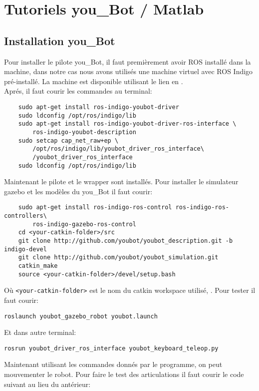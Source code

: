 \section{Tutoriels you\_Bot / Matlab}
\label{appen:commum}
\subsection{Installation you\_Bot}
Pour installer le pilote you\_Bot, il faut premièrement avoir ROS installé dans la machine, dans notre cas nous avons utilisés une machine virtuel avec ROS Indigo pré-installé. La machine est disponible utilisant le lien en \cite{downloadmachine}.\\
Aprés, il faut courir les commandes au terminal:


\begin{verbatim}
	sudo apt-get install ros-indigo-youbot-driver
	sudo ldconfig /opt/ros/indigo/lib
	sudo apt-get install ros-indigo-youbot-driver-ros-interface \
	    ros-indigo-youbot-description
	sudo setcap cap_net_raw+ep \
	    /opt/ros/indigo/lib/youbot_driver_ros_interface\
	    /youbot_driver_ros_interface
	sudo ldconfig /opt/ros/indigo/lib
\end{verbatim}
	Maintenant le pilote et le \flqq{}wrapper\frqq{} sont installés. Pour installer le simulateur gazebo et les modèles du you\_Bot il faut courir:

\begin{verbatim}	
	sudo apt-get install ros-indigo-ros-control ros-indigo-ros-controllers\
	    ros-indigo-gazebo-ros-control
	cd <your-catkin-folder>/src
	git clone http://github.com/youbot/youbot_description.git -b indigo-devel
	git clone http://github.com/youbot/youbot_simulation.git
	catkin_make
	source <your-catkin-folder>/devel/setup.bash
\end{verbatim}

Où \verb|<your-catkin-folder>| est le nom du \flqq catkin workspace\frqq{} utilisé, \cite{roscatkin}.
Pour tester il faut courir:

\begin{verbatim}
roslaunch youbot_gazebo_robot youbot.launch 
\end{verbatim}



Et dans autre terminal:

\begin{verbatim}
rosrun youbot_driver_ros_interface youbot_keyboard_teleop.py
\end{verbatim}

Maintenant utilisant les commandes donnés par le programme, on peut mouvementer le robot. Pour faire le test des articulations il faut courir le code suivant au lieu du antérieur:

